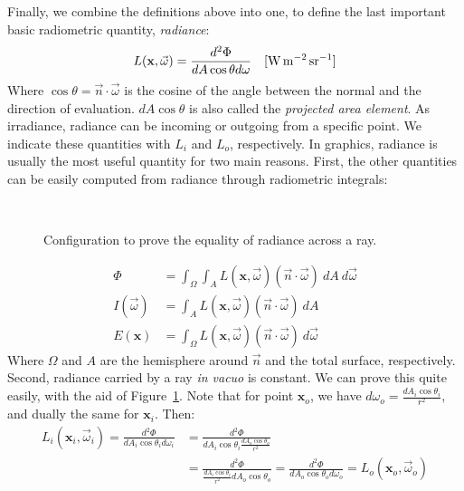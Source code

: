 Finally, we combine the definitions above into one, to define the last important basic radiometric quantity, \emph{radiance}:
\begin{equation*}
L(\mathbf{x}, \vec{\omega}) = \frac{d^2 \Phi}{d A \cos\theta d \omega}  \siunit{\watt \per \square \metre \per \steradian}
\end{equation*}
Where $\cos \theta = \vec{n} \cdot \vec{\omega}$ is the cosine of the angle between the normal and the direction of evaluation. $d A \cos\theta$ is also called the \emph{projected area element}. As irradiance, radiance can be incoming or outgoing from a specific point. We indicate these quantities with $L_i$ and $L_o$, respectively. In graphics, radiance is usually the most useful quantity for two main reasons. First, the other quantities can be easily computed from radiance through radiometric integrals:
\begin{figure}
\centering
   \def\svgwidth{0.8\textwidth}
    \\
\caption{Configuration to prove the equality of radiance across a ray.} %
\label{fig:etendue}
\end{figure}
\begin{equation*}
\begin{split}
\Phi &= \int_{\Omega} \int_{A} L(\mathbf{x}, \vec{\omega})  (\vec{n} \cdot \vec{\omega}) \ dA \ d \vec{\omega} \\
I(\vec{\omega}) &= \int_{A} L(\mathbf{x}, \vec{\omega})  (\vec{n} \cdot \vec{\omega}) \ dA  \\
E(\mathbf{x}) &= \int_{\Omega} L(\mathbf{x}, \vec{\omega})  (\vec{n} \cdot \vec{\omega}) \ d \vec{\omega} 
\end{split}
\end{equation*}
Where $\Omega$ and $A$ are the hemisphere around $\vec{n}$ and the total surface, respectively. Second, radiance carried by a ray \emph{in vacuo} is constant. We can prove this quite easily, with the aid of Figure~\ref{fig:etendue}. Note that for point $\mathbf{x}_o$, we have $d \omega_o = \frac{d A_i \cos\theta_i}{r^2}$, and dually the same for $\mathbf{x}_i$. Then:
\begin{equation*}
\begin{split}
L_i(\mathbf{x}_i, \vec{\omega}_i) = \frac{d^2 \Phi}{d A_i \cos\theta_i d \omega_i} &= 
\frac{d^2 \Phi}{d A_i \cos\theta_i \frac{d A_o \cos\theta_o}{r^2}}  
\\ &= \frac{d^2 \Phi}{\frac{d A_i \cos\theta_i}{r^2} d A_o \cos\theta_o } 
= \frac{d^2 \Phi}{d A_o \cos\theta_o d \omega_o} = L_o(\mathbf{x}_o, \vec{\omega}_o)
\end{split}
\end{equation*}

